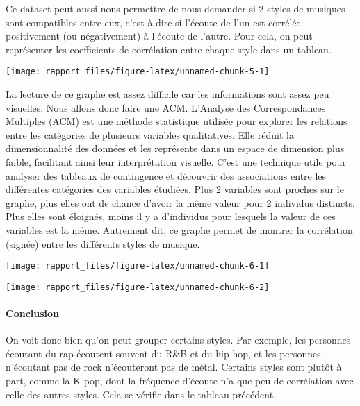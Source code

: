 \documentclass[
]{article}
\begin{document}
Ce dataset peut aussi nous permettre de nous demander si 2 styles de
musiques sont compatibles entre-eux, c'est-à-dire si l'écoute de l'un
est corrélée positivement (ou négativement) à l'écoute de l'autre. Pour
cela, on peut représenter les coefficients de corrélation entre chaque
style dans un tableau.

\begin{center}\texttt{[image: rapport\_files/figure-latex/unnamed-chunk-5-1]} \end{center}

La lecture de ce graphe est assez difficile car les informations sont
assez peu visuelles. Nous allons donc faire une ACM. L'Analyse des
Correspondances Multiples (ACM) est une méthode statistique utilisée
pour explorer les relations entre les catégories de plusieurs variables
qualitatives. Elle réduit la dimensionnalité des données et les
représente dans un espace de dimension plus faible, facilitant ainsi
leur interprétation visuelle. C'est une technique utile pour analyser
des tableaux de contingence et découvrir des associations entre les
différentes catégories des variables étudiées. Plus 2 variables sont
proches sur le graphe, plus elles ont de chance d'avoir la même valeur
pour 2 individus distincts. Plus elles sont éloignés, moins il y a
d'individus pour lesquels la valeur de ces variables est la même.
Autrement dit, ce graphe permet de montrer la corrélation (signée) entre
les différents styles de musique.

\begin{center}\texttt{[image: rapport\_files/figure-latex/unnamed-chunk-6-1]} \end{center}

\begin{center}\texttt{[image: rapport\_files/figure-latex/unnamed-chunk-6-2]} \end{center}

\hypertarget{conclusion-2}{%
\paragraph{\texorpdfstring{\textbf{Conclusion}}{Conclusion}}\label{conclusion-2}}

On voit donc bien qu'on peut grouper certains styles. Par exemple, les
personnes écoutant du rap écoutent souvent du R\&B et du hip hop, et les
personnes n'écoutant pas de rock n'écouteront pas de métal. Certains
styles sont plutôt à part, comme la K pop, dont la fréquence d'écoute
n'a que peu de corrélation avec celle des autres styles. Cela se vérifie
dans le tableau précédent.
\end{document}
